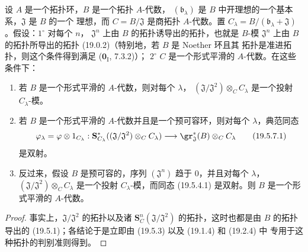 \begin{corollary}[19.5.7]
\label{0.19.5.7-fr}
设 $A$ 是一个拓扑环，$B$ 是一个拓扑 $A$-代数，
$(\mathfrak b_\lambda)$ 是 $B$ 中开理想的一个基本系，$\mathfrak J$ 是 $B$ 的一个
理想，而 $C=B/\mathfrak J$ 是商拓扑 $A$-代数。置
$C_\lambda=B/(\mathfrak b_\lambda+\mathfrak J)$。假设：$1^\circ$ 对每个 $n$，
$\mathfrak J^n$ 上由 $B$ 的拓扑诱导出的拓扑，也就是 $B$-模
$\mathfrak J^n$ 上由 $B$ 的拓扑所导出的拓扑 (19.0.2)（特别地，若 $B$ 是
Noether 环且其
拓扑是准进拓扑，则这个条件得到满足 ($\mathbf 0_{\mathrm I}$, 7.3.2)）；
$2^\circ$ $C$ 是一个形式平滑的 $A$-代数。在这些条件下：
\begin{enumerate}
  \item[\rm(i)] 若 $B$ 是一个形式平滑的 $A$-代数，则对每个 $\lambda$，
  $(\mathfrak J/\mathfrak J^2)\otimes_C C_\lambda$ 是一个投射
  $C_\lambda$-模。
  \item[\rm(ii)] 若 $B$ 是一个形式平滑的 $A$-代数并且是一个预可容环，则对每个
  $\lambda$，典范同态
  \begin{equation}
  \label{0.19.5.7.1-fr}
    \varphi_\lambda=\varphi\otimes 1_{C_\lambda}:
    \mathbf S_{C_\lambda}^*((\mathfrak J/\mathfrak J^2)\otimes_C C_\lambda)
    \longrightarrow\gr_{\mathfrak J}^*(B)\otimes_C C_\lambda
    \tag{19.5.7.1}
  \end{equation}
  是双射。


  \item[\rm(iii)] 反过来，假设 $B$ 是预可容的，序列 $(\mathfrak J^n)$ 趋于
  $0$，并且对每个 $\lambda$，
  $(\mathfrak J/\mathfrak J^2)\otimes_C C_\lambda$ 是一个投射
  $C_\lambda$-模，而同态 (19.5.4.1) 是双射。则 $B$ 是一个形式平滑的
  $A$-代数。
\end{enumerate}
\end{corollary}

\begin{proof}
事实上，$\mathfrak J/\mathfrak J^2$ 的拓扑以及诸
$\mathbf S_C^n(\mathfrak J/\mathfrak J^2)$ 的拓扑，这时也都是由 $B$ 的拓扑
导出的 (19.5.1)；各结论于是立即由 (19.5.3) 以及 (19.1.4) 和 (19.2.4) 中
专用于这种拓扑的判别准则得到。
\end{proof}

